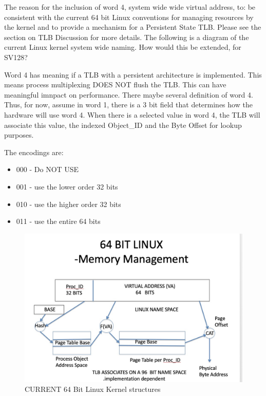 \documentclass{article}
\begin{document}
The reason for the inclusion of word 4,  system wide wide virtual address, to:  be consistent with the current 64 bit Linux conventions for managing resources by the kernel and to provide a mechanism for a Persistent State TLB. Please see the section on TLB Discussion for more details.  The following is a diagram of the current Linux kernel system wide naming.  How would this be extended,  for SV128?

Word  4   has  meaning if a TLB with a persistent architecture is implemented.  This means process multiplexing DOES NOT  flush the TLB.  This can have meaningful imnpact on performance.  There maybe several   definition of word 4.  Thus,  for now, assume in word 1,  there is a 3 bit field that determines how the hardware will use word 4.  When there is a selected value in word 4,  the TLB will associate this value,  the indexed Object\_ID  and the Byte Offset for lookup purposes.

The encodings are: 

\begin{itemize}
    \item 000 - Do NOT USE
    \item 001 - use the lower order 32 bits
    \item 010 - use the higher order 32 bits
    \item 011 - use the entire 64 bits
\end{itemize}




\begin{figure}[h]
\begin{center}
\includegraphics[scale=.3]{figures/96_bit_linux.jpg}
\caption{CURRENT 64 Bit Linux Kernel structures}
\end{center}
\end{figure}
\end{document}
